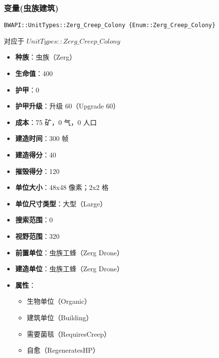 \subsubsection{变量(虫族建筑)}

\begin{tcolorbox}[colback=white, colframe=black!60!white, title=Zerg\_Creep\_Colony(), arc=0mm]
    \begin{verbatim}
BWAPI::UnitTypes::Zerg_Creep_Colony {Enum::Zerg_Creep_Colony}
    \end{verbatim}
    对应于  $UnitTypes::Zerg\_Creep\_Colony$ 
    \begin{itemize}
        \item \textbf{种族}：虫族（Zerg）
        \item \textbf{生命值}：400
        \item \textbf{护甲}：0
        \item \textbf{护甲升级}：升级 60（Upgrade 60）
        \item \textbf{成本}：75 矿，0 气，0 人口
        \item \textbf{建造时间}：300 帧
        \item \textbf{建造得分}：40
        \item \textbf{摧毁得分}：120
        \item \textbf{单位大小}：48x48 像素；2x2 格
        \item \textbf{单位尺寸类型}：大型（Large）
        \item \textbf{搜索范围}：0
        \item \textbf{视野范围}：320
        \item \textbf{前置单位}：虫族工蜂（Zerg Drone）
        \item \textbf{建造单位}：虫族工蜂（Zerg Drone）
        \item \textbf{属性}：
            \begin{itemize}
                \item 生物单位（Organic）
                \item 建筑单位（Building）
                \item 需要菌毯（RequiresCreep）
                \item 自愈（RegeneratesHP）
            \end{itemize}
    \end{itemize}
\end{tcolorbox}

